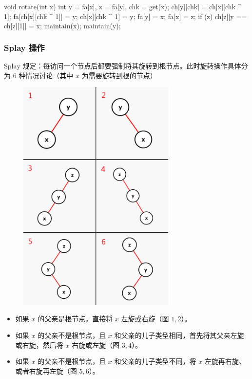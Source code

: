 \begin{cppcode}
void rotate(int x) {
  int y = fa[x], z = fa[y], chk = get(x);
  ch[y][chk] = ch[x][chk ^ 1];
  fa[ch[x][chk ^ 1]] = y;
  ch[x][chk ^ 1] = y;
  fa[y] = x;
  fa[x] = z;
  if (z) ch[z][y == ch[z][1]] = x;
  maintain(x);
  maintain(y);
}
\end{cppcode}

\subsubsection{Splay 操作}

$\text{Splay}$ 规定：每访问一个节点后都要强制将其旋转到根节点。此时旋转操作具体分为 $6$ 种情况讨论（其中 $x$ 为需要旋转到根的节点）

\begin{figure}[htbp]
\centering
\includegraphics[width=0.7\textwidth]{docs/ds/images/splay1.png} 

\end{figure}

\begin{itemize}
\item 如果 $x$ 的父亲是根节点，直接将 $x$ 左旋或右旋（图 $1,2$）。
\item 如果 $x$ 的父亲不是根节点，且 $x$ 和父亲的儿子类型相同，首先将其父亲左旋或右旋，然后将 $x$ 右旋或左旋（图 $3,4$）。
\item 如果 $x$ 的父亲不是根节点，且 $x$ 和父亲的儿子类型不同，将 $x$ 左旋再右旋、或者右旋再左旋（图 $5,6$）。
\end{itemize}

